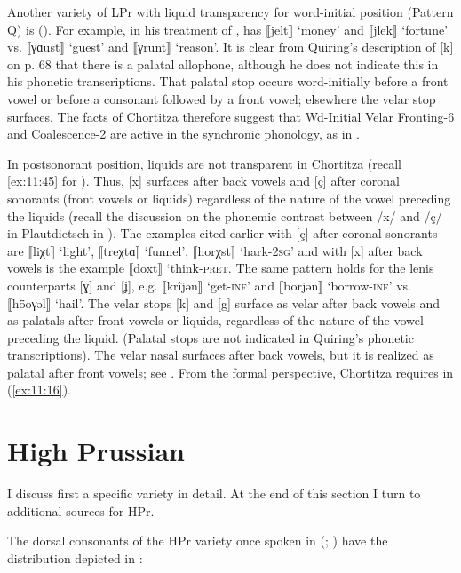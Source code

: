 Another variety of LPr with liquid transparency for word-initial position (Pattern Q) is  (). For example, in his treatment of , \citet{Quiring1928} has ⟦jelt⟧ ‘money' and ⟦jlek⟧ ‘fortune’ vs. ⟦γɑust⟧ ‘guest' and ⟦γrunt⟧ ‘reason'. It is clear from Quiring's description of [k] on p. 68 that there is a palatal allophone, although he does not indicate this in his phonetic transcriptions. That palatal stop occurs word-initially before a front vowel or before a consonant followed by a front vowel; elsewhere the velar stop surfaces. The facts of Chortitza therefore suggest that Wd-Initial Velar Fronting-6 and Coalescence-2 are active in the synchronic phonology, as in .

In postsonorant position, liquids are not transparent in Chortitza (recall \ref{ex:11:45} for ). Thus, [x] surfaces after back vowels and [ç] after coronal sonorants (front vowels or liquids) regardless of the nature of the vowel preceding the liquids (recall the discussion on the phonemic contrast between /x/ and /ç/ in Plautdietsch in ). The examples cited earlier with [ç] after coronal sonorants are ⟦liχt⟧ ‘light', ⟦treχtɑ⟧ ‘funnel’, ⟦horχst⟧ ‘hark-\textsc{2sg}' and with [x] after back vowels is the example ⟦doxt⟧ ‘think-\textsc{pret}. The same pattern holds for the lenis counterparts [ɣ] and [ʝ], e.g. ⟦krîjən⟧ ‘get-\textsc{inf}’ and ⟦borjən⟧ ‘borrow-\textsc{inf}’ vs. ⟦hȫoγəl⟧ ‘hail'. The velar stops [k] and [g] surface as velar after back vowels and as palatals after front vowels or liquids, regardless of the nature of the vowel preceding the liquid. (Palatal stops are not indicated in Quiring's phonetic transcriptions). The velar nasal surfaces after back vowels, but it is realized as palatal after front vowels; see \citet[75]{Quiring1928}. From the formal perspective, Chortitza requires  in (\ref{ex:11:16}).

\section{{High} {Prussian}}\label{sec:11.7}

I discuss first a specific variety in detail. At the end of this section I turn to additional sources for HPr.

The dorsal consonants of the HPr variety once spoken in  (\citealt{KuckWiesinger1965}; ) have the distribution depicted in :

